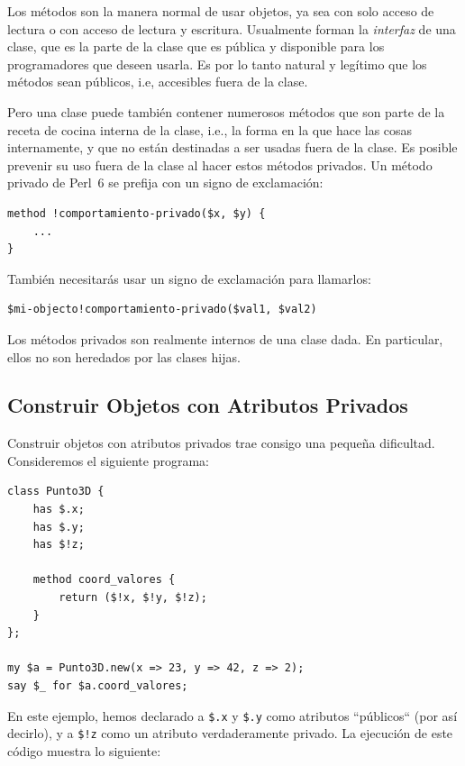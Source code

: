 Los métodos son la manera normal de usar objetos, ya sea con
solo acceso de lectura o con acceso de lectura y escritura. 
Usualmente forman la \emph{interfaz} de una clase, que es la
parte de la clase que es pública y disponible para los programadores que deseen usarla. Es por lo tanto natural y legítimo que los métodos sean públicos, i.e, accesibles fuera
de la clase.

Pero una clase puede también contener numerosos métodos
que son parte de la receta de cocina interna de la clase, i.e.,
la forma en la que hace las cosas internamente, y que no están
destinadas a ser usadas fuera de la clase. Es posible prevenir 
su uso fuera de la clase al hacer estos métodos privados. 
Un método privado de Perl~6 se prefija con un signo de 
exclamación:

\begin{verbatim}
method !comportamiento-privado($x, $y) {
    ...
}
\end{verbatim}

También necesitarás usar un signo de exclamación para llamarlos:

\begin{verbatim}
$mi-objecto!comportamiento-privado($val1, $val2)
\end{verbatim}

Los métodos privados son realmente internos de una clase 
dada. En particular, ellos no son heredados por las clases hijas.


\subsection{Construir Objetos con Atributos Privados}

Construir objetos con atributos privados trae consigo una
pequeña dificultad. Consideremos el siguiente programa:

\begin{verbatim}
class Punto3D {
    has $.x;
    has $.y;
    has $!z;
    
    method coord_valores {
        return ($!x, $!y, $!z);
    }
};

my $a = Punto3D.new(x => 23, y => 42, z => 2);
say $_ for $a.coord_valores;
\end{verbatim}

En este ejemplo, hemos declarado a \verb|$.x| y \verb|$.y|
como atributos ``públicos`` (por así decirlo), y a \verb|$!z|
como un atributo verdaderamente privado. La ejecución de 
este código muestra lo siguiente:

